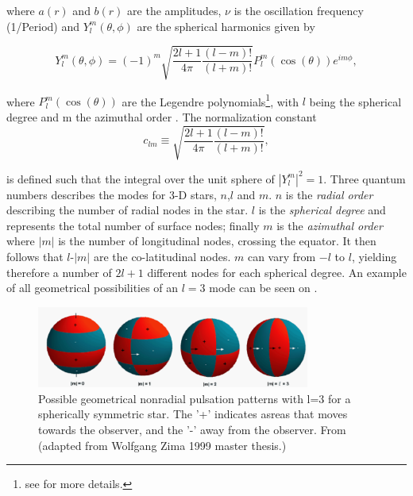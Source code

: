 \noindent where $a(r)$ and $b(r)$ are the amplitudes, $\nu$ is the oscillation frequency (1/Period) and $Y^{m}_l(\theta,\phi)$ are the spherical harmonics given by 

\begin{equation}
    Y^{m}_l(\theta,\phi) = (-1)^{m}\sqrt{\frac{2l+1}{4\pi}\frac{(l-m)!}{(l+m)!}}P^{m}_l(\cos(\theta))e^{im\phi},
\end{equation}

\noindent where $P^{m}_l(\cos(\theta))$ are the Legendre polynomials\footnote{see \citet{aerts2010} for more details.}, with $l$ being the spherical degree and m the azimuthal order . The normalization constant 
\begin{equation}
    c_{lm} \equiv \sqrt{\frac{2l+1}{4\pi}\frac{(l-m)!}{(l+m)!}},
\end{equation}

\noindent is defined such that the integral over the unit sphere of $|Y^{m}_l|^2 = 1 $. Three quantum numbers describes the modes for 3-D stars, $n$,$l$ and $m$. $n$ is the \textit{radial order} describing the number of radial nodes in the star. $l$ is the \textit{spherical degree} and represents the total number of surface nodes; finally $m$ is the \textit{azimuthal order} where $|m|$ is the number of longitudinal nodes, crossing the equator. It then follows that $l$-$|m|$ are the co-latitudinal nodes. $m$ can vary from $-l$ to $l$, yielding therefore a number of $2l+1$ different nodes for each spherical degree. An example of all geometrical possibilities of an $l=3$ mode can be seen on . 

\begin{figure}[t]
    \centering
    \includegraphics[width=0.8\textwidth]{nonradial.png}
    \caption{Possible geometrical nonradial pulsation patterns with l=3 for a spherically symmetric star. The '+' indicates asreas that moves towards the observer, and the '-' away from the observer. From \citet{antoci2011excitation} (adapted from Wolfgang Zima 1999 master thesis.)}
    \label{l3}
\end{figure}

